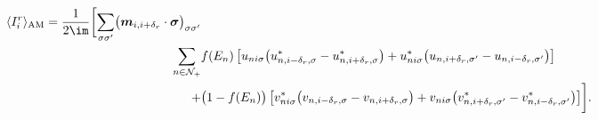 \documentclass[../main.tex]{subfile}
\begin{document}
\begin{equation}
    \begin{aligned}
        \langle I_i^r\rangle_{\text{AM}} = \frac{1}{2\im}\biggl[ \sum_{\sigma\sigma'}\bigl(\bm{m}_{i,i+\delta_r}\cdot\bm{\sigma}\bigr)_{\sigma\sigma'}\\
\sum_{n\in\mathcal{N}_+}& f(E_n)                \left[u_{ni\sigma}       \bigl(u_{n,i-\delta_r,\sigma}^{\ast} - u_{n,i+\delta_r,\sigma}^{\ast}\bigr) + u_{ni\sigma}^{\ast}\bigl(u_{n,i+\delta_r,\sigma'}        - u_{n,i-\delta_r,\sigma'}       \bigr)\right]\\
                         +&\bigl(1-f(E_n)\bigr) \left[v_{ni\sigma}^{\ast}\bigl(v_{n,i-\delta_r,\sigma}        - v_{n,i+\delta_r,\sigma}       \bigr) + v_{ni\sigma}       \bigl(v_{n,i+\delta_r,\sigma'}^{\ast} - v_{n,i-\delta_r,\sigma'}^{\ast}\bigr)\right]\biggr].\\
    \end{aligned}
\end{equation}
\end{document}
